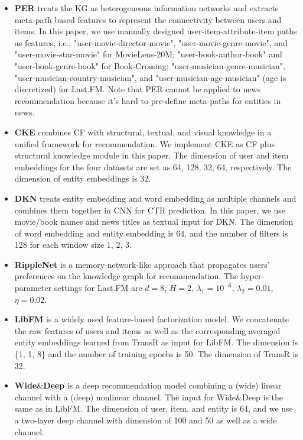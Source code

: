 \documentclass[sigconf]{acmart}
\begin{document}
		\begin{itemize}
			\item
				\textbf{PER} \cite{yu2014personalized} treats the KG as heterogeneous information networks and extracts meta-path based features to represent the connectivity between users and items.
				In this paper, we use manually designed user-item-attribute-item paths as
features, i.e., "user-movie-director-movie", "user-movie-genre-movie", and "user-movie-star-movie" for MovieLens-20M; "user-book-author-book" and "user-book-genre-book" for Book-Crossing; "user-musician-genre-musician", "user-musician-country-musician", and "user-musician-age-musician" (age is discretized) for Last.FM.
				Note that PER cannot be applied to news recommendation because it's hard to pre-define meta-paths for entities in news.
			\item
				\textbf{CKE} \cite{zhang2016collaborative} combines CF with structural, textual, and visual knowledge in a unified framework for recommendation.
				We implement CKE as CF plus structural knowledge module in this paper.
				The dimension of user and item embeddings for the four datasets are set as 64, 128, 32, 64, respectively.
				The dimension of entity embeddings is $32$.
			\item
				\textbf{DKN} \cite{wang2018dkn} treats entity embedding and word embedding as multiple channels and combines them together in CNN for CTR prediction.
				In this paper, we use movie/book names and news titles as textual input for DKN.
				The dimension of word embedding and entity embedding is 64, and the number of filters is 128 for each window size 1, 2, 3.
			\item				
				\textbf{RippleNet} \cite{wang2018ripple} is a memory-network-like approach that propagates users’ preferences on the knowledge graph for recommendation.
				The hyper-parameter settings for Last.FM are $d=8$, $H=2$, $\lambda_1 = 10^{-6}$, $\lambda_2=0.01$, $\eta=0.02$.
			\item
				\textbf{LibFM} \cite{rendle2012factorization} is a widely used feature-based factorization model.
				We concatenate the raw features of users and items as well as the corresponding averaged entity embeddings learned from TransR \cite{lin2015learning} as input for LibFM.
				The dimension is \{1, 1, 8\} and the number of training epochs is 50.
				The dimension of TransR is 32.
			\item
				\textbf{Wide$\&$Deep} \cite{cheng2016wide} is a deep recommendation model combining a (wide) linear channel with a (deep) nonlinear channel.
				The input for Wide$\&$Deep is the same as in LibFM.
				The dimension of user, item, and entity is 64, and we use a two-layer deep channel with dimension of 100 and 50 as well as a wide channel.
		\end{itemize}
		
\end{document}

